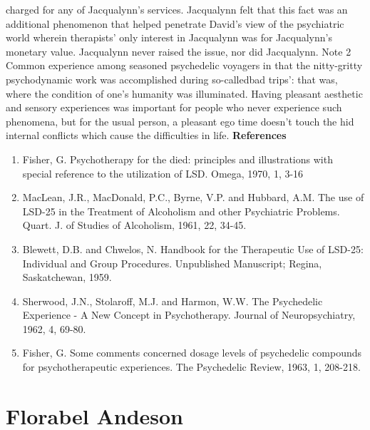 \documentclass[12pt]{book}
\begin{document}
charged for any of Jacqualynn's services. Jacqualynn felt that this fact was an additional phenomenon that helped penetrate David's view of the psychiatric world wherein therapists' only interest in Jacqualynn was for Jacqualynn's monetary value. Jacqualynn never raised the issue, nor did Jacqualynn. Note 2 Common experience among seasoned psychedelic voyagers in that the nitty-gritty psychodynamic work was accomplished during so-calledbad trips': that was, where the condition of one's humanity was illuminated. Having pleasant aesthetic and sensory experiences was important for people who never experience such phenomena, but for the usual person, a pleasant ego time doesn't touch the hid internal conflicts which cause the difficulties in life. \textbf{References} \begin{enumerate} \item Fisher, G. Psychotherapy for the died: principles and illustrations with special reference to the utilization of LSD. Omega, 1970, 1, 3-16 \item MacLean, J.R., MacDonald, P.C., Byrne, V.P. and Hubbard, A.M. The use of LSD-25 in the Treatment of Alcoholism and other Psychiatric Problems. Quart. J. of Studies of Alcoholism, 1961, 22, 34-45. \item Blewett, D.B. and Chwelos, N. Handbook for the Therapeutic Use of LSD-25: Individual and Group Procedures. Unpublished Manuscript; Regina, Saskatchewan, 1959. \item Sherwood, J.N., Stolaroff, M.J. and Harmon, W.W. The Psychedelic Experience - A New Concept in Psychotherapy. Journal of Neuropsychiatry, 1962, 4, 69-80. \item Fisher, G. Some comments concerned dosage levels of psychedelic compounds for psychotherapeutic experiences. The Psychedelic Review, 1963, 1, 208-218. \end{enumerate}



\chapter{Florabel Andeson}
\end{document}
